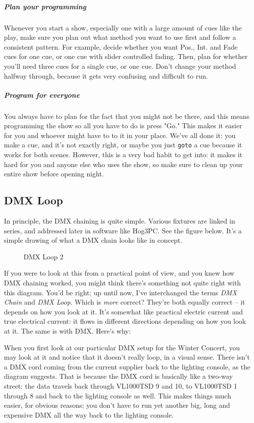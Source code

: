 \documentclass[letterpaper,10pt,oneside,headsepline]{scrreprt}
\begin{document}
\subparagraph{Plan your programming} Whenever you start a show, especially one with a large amount of cues like the play, make sure you plan out what method you want to use first and follow a consistent pattern. For example, decide whether you want Pos., Int. and Fade cues for one cue, or one cue with slider controlled fading. Then, plan for whether you'll need three cues for a single cue, or one cue. Don't change your method halfway through, because it gets very confusing and difficult to run.

\subparagraph{Program for everyone} You always have to plan for the fact that you might not be there, and this means programming the show so all you have to do is press "Go." This makes it easier for you and whoever might have to to it in your place. We've all done it: you make a cue, and it's not exactly right, or maybe you just \texttt{goto} a cue because it works for both scenes. However, this is a very bad habit to get into: it makes it hard for you and anyone else who uses the show, so make sure to clean up your entire show before opening night.

\subsection{DMX Loop}
In principle, the DMX chaining is quite simple. Various fixtures are linked in series, and addressed later in software like Hog3PC. See the figure below. It's a simple drawing of what a DMX chain looks like in concept.
\begin{figure}[ht]
\caption{DMX Loop 2}
\end{figure}

If you were to look at this from a practical point of view, and you knew how DMX chaining worked, you might think there's something not quite right with this diagram. You'd be right; up until now, I've interchanged the terms \textit{DMX Chain} and \textit{DMX Loop}. Which is \textit{more} correct? They're both equally correct -- it depends on how you look at it. It's somewhat like practical electric current and true electrical current: it flows in different directions depending on how you look at it. The same is with DMX. Here's why:

When you first look at our particular DMX setup for the Winter Concert, you may look at it and notice that it doesn't really loop, in a visual sense. There isn't a DMX cord coming from the current supplier back to the lighting console, as the diagram suggests. That is because the DMX cord is basically like a two-way street: the data travels back through VL1000TSD 9 and 10, to VL1000TSD 1 through 8 and back to the lighting console as well. This makes things much easier, for obvious reasons; you don't have to run yet another big, long and expensive DMX all the way back to the lighting console.  
\end{document}
